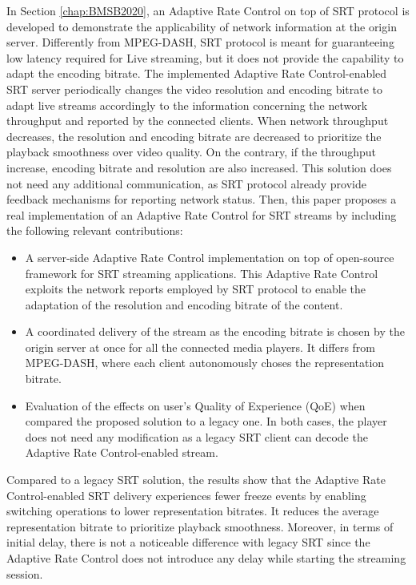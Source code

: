 In Section \ref{chap:BMSB2020}, an Adaptive Rate Control on top of SRT protocol is developed to demonstrate the applicability of network information at the origin server. Differently from MPEG-DASH, SRT protocol is meant for guaranteeing low latency required for Live streaming, but it does not provide the capability to adapt the encoding bitrate. The implemented Adaptive Rate Control-enabled SRT server periodically changes the video resolution and encoding bitrate to adapt live streams accordingly to the information concerning the network throughput and reported by the connected clients. When network throughput decreases, the resolution and encoding bitrate are decreased to prioritize the playback smoothness over video quality. On the contrary, if the throughput increase, encoding bitrate and resolution are also increased. This solution does not need any additional communication, as SRT protocol already provide feedback mechanisms for reporting network status. Then, this paper proposes a real implementation of an Adaptive Rate Control for SRT streams by including the following relevant contributions:
\begin{itemize}
	\item A server-side Adaptive Rate Control implementation on top of open-source framework for SRT streaming applications. This Adaptive Rate Control exploits the network reports employed by SRT protocol to enable the adaptation of the resolution and encoding bitrate of the content.
	\item A coordinated delivery of the stream as the encoding bitrate is chosen by the origin server at once for all the connected media players. It differs from MPEG-DASH, where each client autonomously choses the representation bitrate.
	\item Evaluation of the effects on user's Quality of Experience (QoE) when compared the proposed solution to a legacy one. In both cases, the player does not need any modification as a legacy SRT client can decode the Adaptive Rate Control-enabled stream.
\end{itemize}
Compared to a legacy SRT solution, the results show that the Adaptive Rate Control-enabled SRT delivery experiences fewer freeze events by enabling switching operations to lower representation bitrates. It reduces the average representation bitrate to prioritize playback smoothness. Moreover, in terms of initial delay, there is not a noticeable difference with legacy SRT since the Adaptive Rate Control does not introduce any delay while starting the streaming session.

